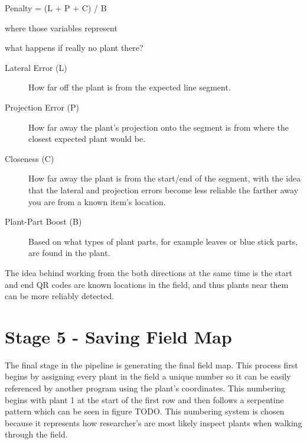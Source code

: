 Penalty = (L + P + C) / B

where those variables represent

what happens if really no plant there?

\begin{description}
\item[Lateral Error (L)] How far off the plant is from the expected line segment.
\item[Projection Error (P)] How far away the plant's projection onto the segment is from where the closest expected plant would be.
\item[Closeness (C)] How far away the plant is from the start/end of the segment, with the idea that the lateral and projection errors become less reliable the farther away you are from a known item's location.
\item[Plant-Part Boost (B)] Based on what types of plant parts, for example leaves or blue stick parts, are found in the plant.
\end{description}

The idea behind working from the both directions at the same time is the start and end QR codes are known locations in the field, and thus plants near them can be more reliably detected. 

\section{Stage 5 - Saving Field Map}
\label{processing-stage5}

The final stage in the pipeline is generating the final field map.  This process first begins by assigning every plant in the field a unique number so it can be easily referenced by another program using the plant's coordinates.  This numbering begins with plant 1 at the start of the first row and then follows a serpentine pattern which can be seen in figure TODO.  This numbering system is chosen because it represents how researcher's are most likely inspect plants when walking through the field.  

